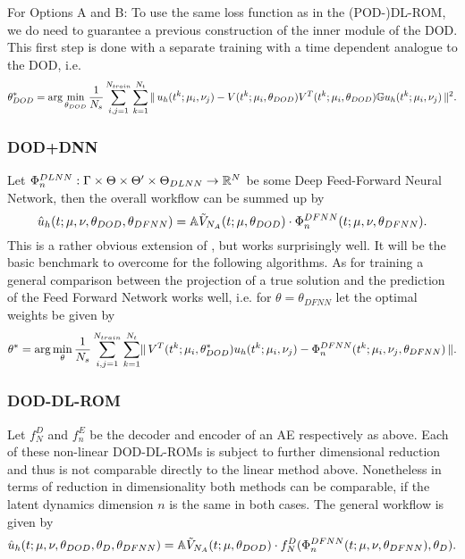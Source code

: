 For Options A and B: To use the same loss function as in the (POD-)DL-ROM, we do need to guarantee a previous construction of the inner module of the DOD. This first step is done with a separate training with a time dependent analogue to the DOD, i.e.
\begin{equation}
    \theta_{DOD}^* = \operatorname{arg}\min_{\theta_{DOD}} \frac{1}{N_s} \sum_{i,j = 1}^{N_{train}} \sum_{k = 1}^{N_t} \, \lVert \, u_h(t^k; \mu_i, \nu_j) - V(t^k; \mu_i, \theta_{DOD}) V^T(t^k; \mu_i, \theta_{DOD}) \mathbb{G} u_h(t^k; \mu_i, \nu_j) \, \rVert^2.
\end{equation}

\subsubsection{DOD+DNN} \label{subsec: DOD+DNN}

Let $\Phi_n^{DLNN}: \Gamma \times \Theta \times \Theta' \times \Theta_{DLNN} \to \mathbb{R}^{N}$ be some Deep Feed-Forward Neural Network, then the overall workflow can be summed up by
\begin{equation}
    \hat{u}_h(t; \mu, \nu, \theta_{DOD}, \theta_{DFNN}) = \mathbb{A} \Tilde{V}_{N_A}(t; \mu, \theta_{DOD}) \cdot \Phi_n^{DFNN}(t; \mu, \nu, \theta_{DFNN}).
\end{equation}
This is a rather obvious extension of \cite{DOD}, but works surprisingly well. It will be the basic benchmark to overcome for the following algorithms. As for training a general comparison between the projection of a true solution and the prediction of the Feed Forward Network works well, i.e. for $\theta = \theta_{DFNN}$ let the optimal weights be given by
\begin{equation}
    \theta^* = \operatorname{arg}\min_\theta \frac{1}{N_s} \sum_{i, j = 1}^{N_{train}} \sum_{k = 1}^{N_t} \lVert \, V^T(t^k; \mu_i, \theta^*_{DOD}) u_h(t^k; \mu_i, \nu_j) - \Phi_n^{DFNN}(t^k; \mu_i, \nu_j, \theta_{DFNN}) \, \rVert.
\end{equation}

\subsubsection{DOD-DL-ROM}

Let $f_N^D$ and $f_n^E$ be the decoder and encoder of an AE respectively as above. Each of these non-linear DOD-DL-ROMs is subject to further dimensional reduction and thus is not comparable directly to the linear method above. Nonetheless in terms of reduction in dimensionality both methods can be comparable, if the latent dynamics dimension $n$ is the same in both cases. The general workflow is given by
\begin{equation}
    \hat{u}_h(t; \mu, \nu, \theta_{DOD}, \theta_D, \theta_{DFNN}) = \mathbb{A} \Tilde{V}_{N_A}(t; \mu, \theta_{DOD}) \cdot f_N^D(\Phi_n^{DFNN}(t; \mu, \nu, \theta_{DFNN}), \theta_{D}).
\end{equation}

